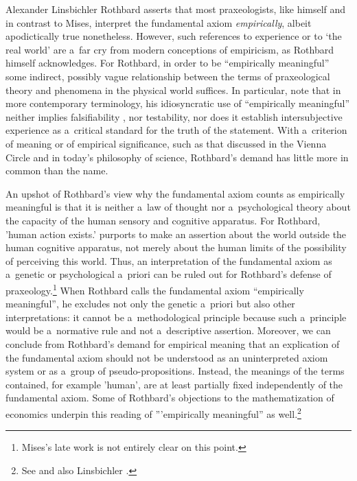 \begin{artengenv}{Alexander Linsbichler}
Rothbard 
\parencite*[][pp.33–34]{rothbard_praxeology_2011} %
 asserts that most praxeologists, like himself and in contrast to Mises, interpret the fundamental axiom \textit{empirically}, albeit apodictically true nonetheless. However, such references to experience or to ‘the real world' are a~far cry from modern conceptions of empiricism, as Rothbard 
\parencite*[][p.318]{rothbard_defense_1957} %
 himself acknowledges. For Rothbard, in order to be ``empirically meaningful'' some indirect, possibly vague relationship between the terms of praxeological theory and phenomena in the physical world suffices. In particular, note that in more contemporary terminology, his idiosyncratic use of ``empirically meaningful'' neither implies falsifiability 
\parencite[][p.25]{rothbard_praxeology:_1976}, %
 nor testability, nor does it establish intersubjective experience as a~critical standard for the truth of the statement. With a~criterion of meaning or of empirical significance, such as that discussed in the Vienna Circle and in today's philosophy of science, Rothbard's demand has little more in common than the name.



An upshot of Rothbard's view why the fundamental axiom counts as empirically meaningful is that it is neither a~law of thought nor a~psychological theory about the capacity of the human sensory and cognitive apparatus. For Rothbard, 'human action exists.' purports to make an assertion about the world outside the human cognitive apparatus, not merely about the human limits of the possibility of perceiving this world. Thus, an interpretation of the fundamental axiom as a~genetic or psychological a~priori can be ruled out for Rothbard's defense of praxeology.\footnote{Mises's late work 
\parencites[][]{mises_ultimate_1962}[][]{mises_ultimate_2012} %
 is not entirely clear on this point.} When Rothbard calls the fundamental axiom ``empirically meaningful'', he excludes not only the genetic a~priori but also other interpretations: it cannot be a~methodological principle because such a~principle would be a~normative rule and not a~descriptive assertion. Moreover, we can conclude from Rothbard's demand for empirical meaning that an explication of the fundamental axiom should not be understood as an uninterpreted axiom system or as a~group of pseudo-propositions. Instead, the meanings of the terms contained, for example 'human', are at least partially fixed independently of the fundamental axiom. Some of Rothbard's objections to the mathematization of economics underpin this reading of '''empirically meaningful'' as well.\footnote{See 
\parencite[][pp.21–24]{rothbard_praxeology:_1976} %
 and also Linsbichler 
\parencites*[][]{linsbichler_sprachgeist_2021}[][]{linsbichler_case_2023}. %
 }


\end{artengenv}
